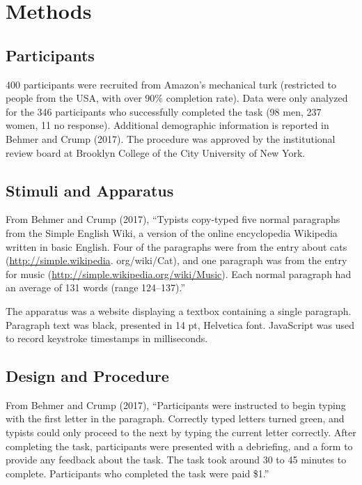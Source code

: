 \documentclass[floatsintext,man]{apa6}
\theoremstyle{definition}
\theoremstyle{definition}
\theoremstyle{definition}
\theoremstyle{remark}
\begin{document}
\section{Methods}\label{methods}

\subsection{Participants}\label{participants}

400 participants were recruited from Amazon's mechanical turk
(restricted to people from the USA, with over 90\% completion rate).
Data were only analyzed for the 346 participants who successfully
completed the task (98 men, 237 women, 11 no response). Additional
demographic information is reported in Behmer and Crump (2017). The
procedure was approved by the institutional review board at Brooklyn
College of the City University of New York.

\subsection{Stimuli and Apparatus}\label{stimuli-and-apparatus}

From Behmer and Crump (2017), \enquote{Typists copy-typed five normal
paragraphs from the Simple English Wiki, a version of the online
encyclopedia Wikipedia written in basic English. Four of the paragraphs
were from the entry about cats (\url{http://simple.wikipedia}.
org/wiki/Cat), and one paragraph was from the entry for music
(\url{http://simple.wikipedia.org/wiki/Music}). Each normal paragraph
had an average of 131 words (range 124--137).}

The apparatus was a website displaying a textbox containing a single
paragraph. Paragraph text was black, presented in 14 pt, Helvetica font.
JavaScript was used to record keystroke timestamps in milliseconds.

\subsection{Design and Procedure}\label{design-and-procedure}

From Behmer and Crump (2017), \enquote{Participants were instructed to
begin typing with the first letter in the paragraph. Correctly typed
letters turned green, and typists could only proceed to the next by
typing the current letter correctly. After completing the task,
participants were presented with a debriefing, and a form to provide any
feedback about the task. The task took around 30 to 45 minutes to
complete. Participants who completed the task were paid \$1.}
\end{document}
